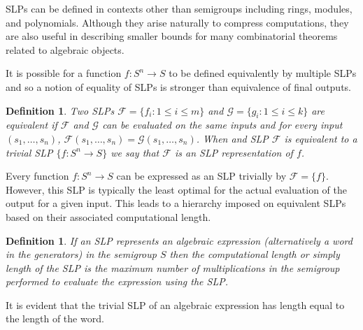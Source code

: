 \documentclass[12pt]{article}
\newtheorem{defn}[thm]{Definition}
\begin{document}
SLPs can be defined in contexts other than semigroups including rings, modules, and polynomials.  Although they arise naturally to compress computations, they are also useful in describing smaller bounds for many combinatorial theorems related to algebraic objects.

It is possible for a function $f:S^n\rightarrow S$ to be defined equivalently by multiple SLPs and so a notion of equality of SLPs is stronger than equivalence of final outputs.

\begin{defn}
Two SLPs $\mathcal{F}=\{f_i:1\leq i\leq m\}$ and $\mathcal{G}=\{g_i:1\leq i\leq k\}$ are \emph{equivalent} if $\mathcal{F}$ and $\mathcal{G}$ can be evaluated
on the same inputs and for every input $(s_1,\dots,s_n)$, $\mathcal{F}(s_1,\dots,s_n)=\mathcal{G}(s_1,\dots,s_n)$.
When and SLP $\mathcal{F}$ is equivalent to a trivial SLP $\{f:S^n\rightarrow S\}$ we say that $\mathcal{F}$ is an \emph{SLP representation} of $f$.
\end{defn}

Every function $f:S^n\rightarrow S$ can be expressed as an SLP trivially by
$\mathcal{F}=\{f\}$.  However, this SLP is typically the least optimal for the actual evaluation of the output for a given input.  This leads to a hierarchy imposed on equivalent SLPs based on their associated computational length.


\begin{defn}
If an SLP represents an algebraic expression (alternatively a word in the generators) in the semigroup $S$ then the
\emph{computational length} or simply \emph{length} of the SLP is the maximum number of multiplications in the semigroup performed to evaluate the expression
using the SLP.
\end{defn}

It is evident that the trivial SLP of an algebraic expression has length equal to the length of the word.
\end{document}
